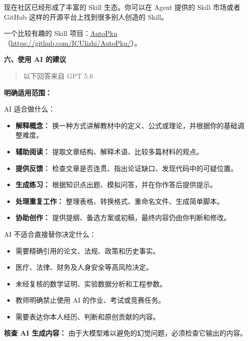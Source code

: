 现在社区已经形成了丰富的 Skill 生态。你可以在 Agent 提供的 Skill 市场或者 GitHub 这样的开源平台上找到很多别人创造的 Skill。

一个比较有趣的 Skill 项目：\href{https://github.com/ICUlizhi/AutoPku/}{AutoPku}（\url{https://github.com/ICUlizhi/AutoPku/}）。

\vspace{10pt}

\textbf{六、使用 AI 的建议}

\begin{quote}
以下回答来自 GPT 5.6
\end{quote}

\textbf{明确适用范围：}

AI 适合做什么：

\begin{itemize}
    \item \textbf{解释概念：} 换一种方式讲解教材中的定义、公式或理论，并根据你的基础调整难度。
    \item \textbf{辅助阅读：} 提取文章结构、解释术语、比较多篇材料的观点。
    \item \textbf{提供反馈：} 检查文章是否连贯、指出论证缺口、发现代码中的可疑位置。
    \item \textbf{生成练习：} 根据知识点出题、模拟问答，并在你作答后提供提示。
    \item \textbf{处理重复工作：} 整理表格、转换格式、重命名文件、生成简单脚本。
    \item \textbf{协助创作：} 提供提纲、备选方案或初稿，最终内容仍由你判断和修改。
\end{itemize}

AI 不适合直接替你决定什么：

\begin{itemize}
    \item 需要精确引用的论文、法规、政策和历史事实。
    \item 医疗、法律、财务及人身安全等高风险决定。
    \item 未经复核的数学证明、实验数据分析和工程参数。
    \item 教师明确禁止使用 AI 的作业、考试或竞赛任务。
    \item 需要表达你本人经历、判断和原创贡献的内容。
\end{itemize}

\textbf{核查 AI 生成内容：} 由于大模型难以避免的幻觉问题，必须检查它输出的内容。

